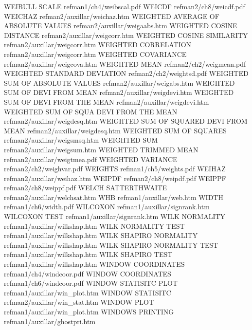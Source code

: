 WEIBULL SCALE                           refman1/ch4/weibscal.pdf
WEICDF                                  refman2/ch8/weicdf.pdf
WEICHAZ                                 refman2/auxillar/weichaz.htm
WEIGHTED AVERAGE OF ABSOLUTE VALUES     refman2/auxillar/weigaabs.htm
WEIGHTED COSINE DISTANCE                refman2/auxillar/weigcorr.htm
WEIGHTED COSINE SIMILARITY              refman2/auxillar/weigcorr.htm
WEIGHTED CORRELATION                    refman2/auxillar/weigcorr.htm
WEIGHTED COVARIANCE                     refman2/auxillar/weigcova.htm
WEIGHTED MEAN                           refman2/ch2/weigmean.pdf
WEIGHTED STANDARD DEVIATION             refman2/ch2/weightsd.pdf
WEIGHTED SUM OF ABSOLUTE VALUES         refman2/auxillar/weigabs.htm
WEIGHTED SUM OF DEVI FROM MEAN          refman2/auxillar/weigdevi.htm
WEIGHTED SUM OF DEVI FROM THE MEAN      refman2/auxillar/weigdevi.htm
WEIGHTED SUM OF SQUA DEVI FROM THE MEAN refman2/auxillar/weigdesq.htm
WEIGHTED SUM OF SQUARED DEVI FROM MEAN  refman2/auxillar/weigdesq.htm
WEIGHTED SUM OF SQUARES                 refman2/auxillar/weigsmsq.htm
WEIGHTED SUM                            refman2/auxillar/weigsum.htm
WEIGHTED TRIMMED MEAN                   refman2/auxillar/weigtmea.pdf
WEIGHTED VARIANCE                       refman2/ch2/weighvar.pdf
WEIGHTS                                 refman1/ch5/weights.pdf
WEIHAZ                                  refman2/auxillar/weihaz.htm
WEIPDF                                  refman2/ch8/weipdf.pdf
WEIPPF                                  refman2/ch8/weippf.pdf
WELCH SATTERTHWAITE                     refman2/auxillar/welchsat.htm
WHB                                     refman1/auxillar/web.htm
WIDTH                                   refman1/ch6/width.pdf
WILCOXON                                refman1/auxillar/signrank.htm
WILCOXON TEST                           refman1/auxillar/signrank.htm
WILK NORMALITY                          refman1/auxillar/wilkshap.htm
WILK NORMALITY TEST                     refman1/auxillar/wilkshap.htm
WILK SHAPIRO NORMALITY                  refman1/auxillar/wilkshap.htm
WILK SHAPIRO NORMALITY TEST             refman1/auxillar/wilkshap.htm
WILK SHAPIRO TEST                       refman1/auxillar/wilkshap.htm
WINDOW COORDINATES                      refman1/ch4/windcoor.pdf
WINDOW COORDINATES                      refman1/ch6/windcoor.pdf
WINDOW STATISITC PLOT                   refman1/auxillar/win_plot.htm
WINDOW STATISITC                        refman2/auxillar/win_stat.htm
WINDOW PLOT                             refman1/auxillar/win_plot.htm
WINDOWS PRINTING                        refman1/auxillar/ghostpri.htm
